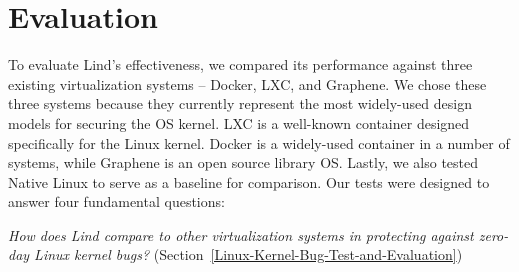 \section{Evaluation}
\label{sec.evaluation}

To evaluate Lind's effectiveness,
we compared its performance against three existing
virtualization systems -- Docker, LXC, and Graphene.
We chose these three systems because they currently represent the most
widely-used design models for securing the OS kernel.
LXC is a well-known container designed specifically for the Linux kernel.
Docker is a widely-used container in a number of systems, while
Graphene is an open source library OS.
Lastly, we also tested Native Linux to serve as a
baseline for comparison.
%
Our tests were designed to answer four fundamental questions:

\textit{How does Lind compare to other virtualization systems
in protecting against zero-day Linux kernel bugs?}
(Section~{\ref{Linux-Kernel-Bug-Test-and-Evaluation}})

